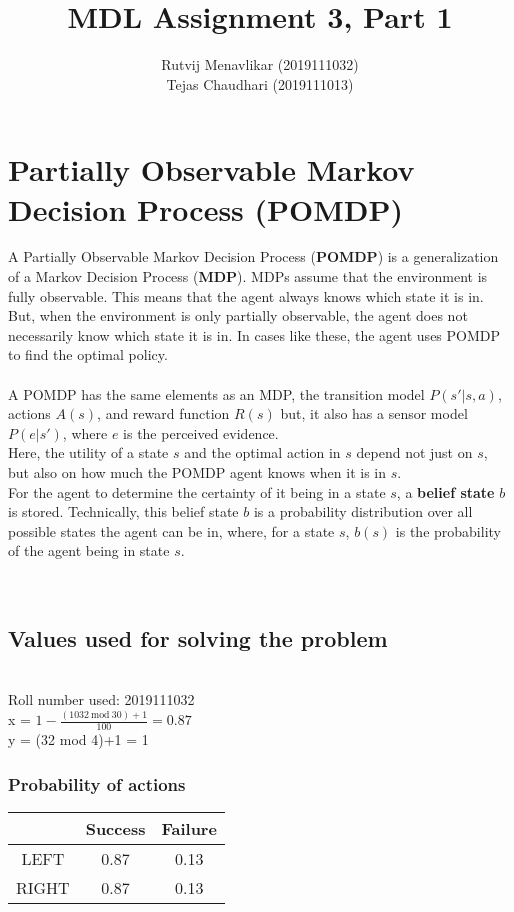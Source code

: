 \documentclass[10pt]{report}
\title{MDL Assignment 3, Part 1}
\author{Rutvij Menavlikar (2019111032) \\ Tejas Chaudhari (2019111013)}
\theoremstyle{definition}
\theoremstyle{plain}
\begin{document}
\begin{titlepage} 
    \maketitle{}
\end{titlepage}


\section*{Partially Observable Markov Decision Process (POMDP)}
A Partially Observable Markov Decision Process (\textbf{POMDP}) is a generalization of a Markov Decision Process (\textbf{MDP}). MDPs assume that the environment is fully observable. This means that the agent always knows which state it is in. But, when the environment is only partially observable, the agent does not necessarily know which state it is in. In cases like these, the agent uses POMDP to find the optimal policy. \\ \\
A POMDP has the same elements as an MDP, the transition model $P(s'\text{|}s,a)$, actions $A(s)$, and reward function $R(s)$ but, it also has a sensor model $P(e\text{|}s')$, where $e$ is the perceived evidence.\\
Here, the utility of a state $s$ and the optimal action in $s$ depend not just on $s$, but also on how much the POMDP agent knows when it is in $s$. \\
For the agent to determine the certainty of it being in a state $s$, a \textbf{belief state} $b$ is stored. Technically, this belief state $b$ is a probability distribution over all possible states the agent can be in, where, for a state $s$, $b(s)$ is the probability of the agent being in state $s$.

\vspace{0.2cm} \\ \hline
\subsection*{Values used for solving the problem}
\textbf{ } \\ Roll number used: 2019111032 \\
x = $1-\frac{(1032\ \text{mod}\ 30) + 1}{100}=0.87$ \\
y = (32 mod 4)+1 = 1 \\

\subsubsection{Probability of actions}
\begin{tabular}{ |c|c|c| } 
 \hline
 & Success & Failure \\ 
 \hline
 LEFT & 0.87 & 0.13 \\ 
 \hline
 RIGHT & 0.87 & 0.13 \\ 
 \hline
\end{tabular}
\end{document}
